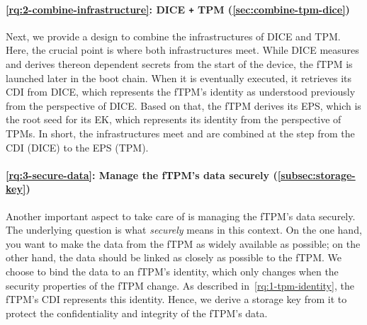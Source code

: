 \paragraph{\ref{rq:2-combine-infrastructure}: \acs{DICE} \texttt{+} \acs{TPM} (\autoref{sec:combine-tpm-dice})}
Next, we provide a design to combine the infrastructures of \ac{DICE} and \ac{TPM}.
Here, the crucial point is where both infrastructures meet.
While \ac{DICE} measures and derives thereon dependent secrets from the start of the device, the \ac{fTPM} is launched later in the boot chain.
When it is eventually executed, it retrieves its \ac{CDI} from \ac{DICE}, which represents the fTPM's identity as understood previously from the perspective of \ac{DICE}.
Based on that, the \ac{fTPM} derives its \ac{EPS}, which is the root seed for its \ac{EK}, which represents its identity from the perspective of \acp{TPM}.
In short, the infrastructures meet and are combined at the step from the \ac{CDI} (DICE) to the \ac{EPS} (TPM).

\paragraph{\ref{rq:3-secure-data}: Manage the fTPM's data securely (\autoref{subsec:storage-key})}
Another important aspect to take care of is managing the fTPM's data securely.
The underlying question is what \emph{securely} means in this context.
On the one hand, you want to make the data from the fTPM as widely available as possible; on the other hand, the data should be linked as closely as possible to the fTPM\@.
We choose to bind the data to an fTPM's identity, which only changes when the security properties of the fTPM change.
As described in~\hyperref[par:identity]{\ref*{rq:1-tpm-identity}}, the fTPM's \ac{CDI} represents this identity.
Hence, we derive a storage key from it to protect the confidentiality and integrity of the fTPM's data.

